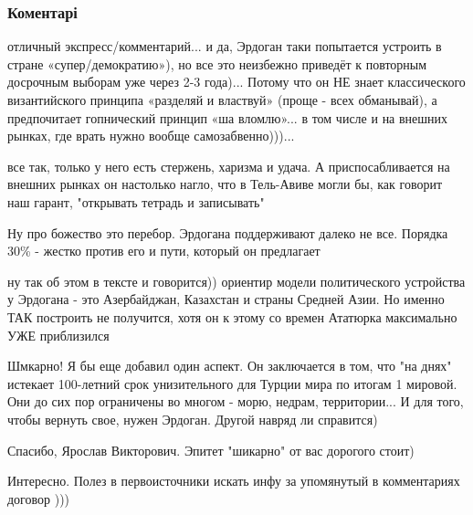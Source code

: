  
 
 
 
 
\subsubsection{Коментарі}
\label{sec:25_06_2018.fb.lesev_igor.1.po_erdoganu.cmt}

\begin{itemize} %

отличный экспресс/комментарий... и да, Эрдоган таки попытается устроить в
стране «супер/демократию»), но все это неизбежно приведёт к повторным досрочным
выборам уже через 2-3 года)... Потому что он НЕ знает классического
византийского принципа «разделяй и властвуй» (проще - всех обманывай), а
предпочитает гопнический принцип «ша вломлю»... в том числе и на внешних
рынках, где врать нужно вообще самозабвенно)))...


все так, только у него есть стержень, харизма и удача. А приспосабливается на
внешних рынках он настолько нагло, что в Тель-Авиве могли бы, как говорит наш
гарант, "открывать тетрадь и записывать"

Ну про божество это перебор. Эрдогана поддерживают далеко не все. Порядка 30\% - жестко против его и пути, который он предлагает

ну так об этом в тексте и говорится)) ориентир модели политического устройства у Эрдогана - это Азербайджан, Казахстан и страны Средней Азии. Но именно ТАК построить не получится, хотя он к этому со времен Ататюрка максимально УЖЕ приблизился


Шмкарно! Я бы еще добавил один аспект. Он заключается в том, что "на днях"
истекает 100-летний срок унизительного для Турции мира по итогам 1 мировой. Они
до сих пор ограничены во многом - морю, недрам, территории... И для того, чтобы
вернуть свое, нужен Эрдоган. Другой навряд ли справится)


Спасибо, Ярослав Викторович. Эпитет "шикарно" от вас дорогого стоит)

Интересно. Полез в первоисточники искать инфу за упомянутый в комментариях договор )))


\end{itemize}
